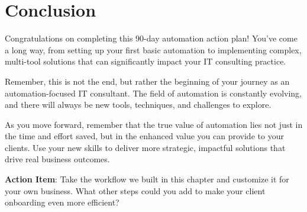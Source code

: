 
\section{Conclusion}

Congratulations on completing this 90-day automation action plan! You've come a long way, from setting up your first basic automation to implementing complex, multi-tool solutions that can significantly impact your IT consulting practice.

Remember, this is not the end, but rather the beginning of your journey as an automation-focused IT consultant. The field of automation is constantly evolving, and there will always be new tools, techniques, and challenges to explore.

As you move forward, remember that the true value of automation lies not just in the time and effort saved, but in the enhanced value you can provide to your clients. Use your new skills to deliver more strategic, impactful solutions that drive real business outcomes.

\textbf{Action Item}: Take the workflow we built in this chapter and customize it for your own business. What other steps could you add to make your client onboarding even more efficient?

